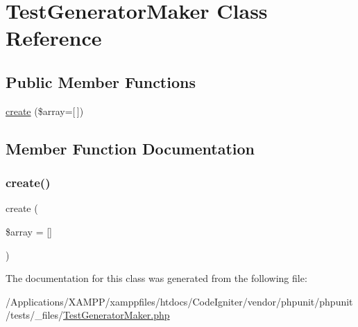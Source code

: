 \hypertarget{class_test_generator_maker}{}\section{Test\+Generator\+Maker Class Reference}
\label{class_test_generator_maker}
\subsection*{Public Member Functions}
\begin{DoxyCompactItemize}
\item 
\mbox{\hyperlink{class_test_generator_maker_ada9e32d7524cf9d63d5535984d5b54d6}{create}} (\$array=\mbox{[}$\,$\mbox{]})
\end{DoxyCompactItemize}


\subsection{Member Function Documentation}
\mbox{\label{class_test_generator_maker_ada9e32d7524cf9d63d5535984d5b54d6}} 
\subsubsection{\texorpdfstring{create()}{create()}}
{\footnotesize\ttfamily create (\begin{DoxyParamCaption}\item[{}]{\$array = {\ttfamily \mbox{[}\mbox{]}} }\end{DoxyParamCaption})}



The documentation for this class was generated from the following file\+:\begin{DoxyCompactItemize}
\item 
/\+Applications/\+X\+A\+M\+P\+P/xamppfiles/htdocs/\+Code\+Igniter/vendor/phpunit/phpunit/tests/\+\_\+files/\mbox{\hyperlink{_test_generator_maker_8php}{Test\+Generator\+Maker.\+php}}\end{DoxyCompactItemize}
